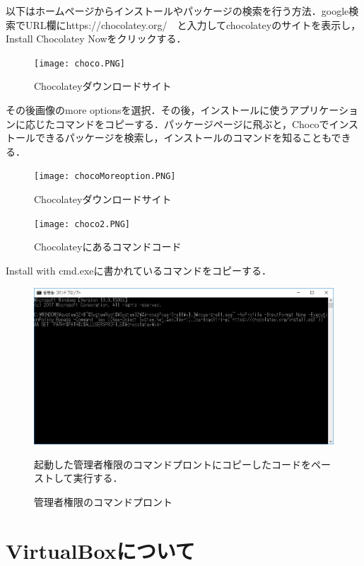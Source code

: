 \newpage

以下はホームページからインストールやパッケージの検索を行う方法．google検索でURL欄にhttps://chocolatey.org/　と入力してchocolateyのサイトを表示し，Install Chocolatey Nowをクリックする．


\begin{figure}[h]
\centering
\texttt{[image: choco.PNG]}
\caption{Chocolateyダウンロードサイト}\label{サンプル図}
\end{figure}


その後画像のmore optionsを選択．その後，インストールに使うアプリケーションに応じたコマンドをコピーする．パッケージページに飛ぶと，Chocoでインストールできるパッケージを検索し，インストールのコマンドを知ることもできる．

\begin{figure}[h]
\centering
\texttt{[image: chocoMoreoption.PNG]}
\caption{Chocolateyダウンロードサイト}\label{サンプル図}
\end{figure}




\newpage

\begin{figure}[h]
\centering
\texttt{[image: choco2.PNG]}
\caption{Chocolateyにあるコマンドコード}\label{サンプル図}
\end{figure}
Install with cmd.exeに書かれているコマンドをコピーする．

\begin{figure}[h]
\centering
\includegraphics[width=12cm]{comand2.PNG}
\caption{管理者権限のコマンドプロント}\label{サンプル図}
起動した管理者権限のコマンドプロントにコピーしたコードをペーストして実行する．
\end{figure}
\newpage



\section{VirtualBoxについて}
